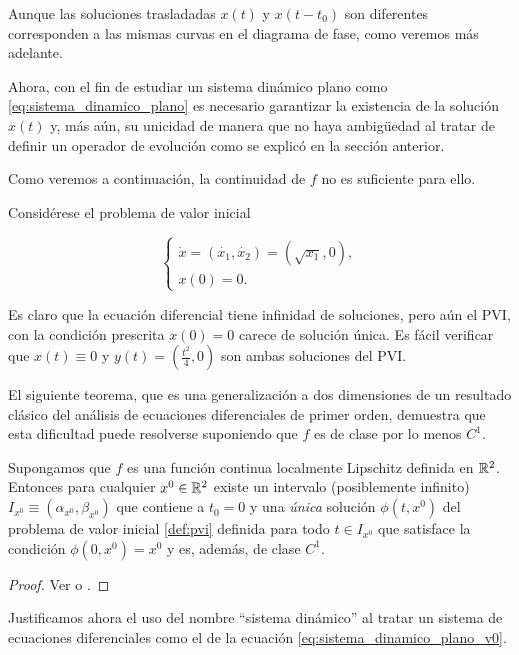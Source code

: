 Aunque las soluciones trasladadas $x(t)$ y $x(t-t_0)$ son diferentes corresponden a las mismas curvas en el diagrama de fase, como veremos más adelante.

Ahora, con el fin de estudiar un sistema dinámico plano como \ref{eq:sistema_dinamico_plano} es necesario garantizar la existencia de la solución $x(t)$ y, más aún, su unicidad de manera que no haya ambigüedad al tratar de definir un operador de evolución como se explicó en la sección anterior.

Como veremos a continuación, la continuidad de $f$ no es suficiente para ello.

\begin{example}Considérese el problema de valor inicial
    
$$
\left\{
    \begin{array}{l}
        \dot{x} = (\dot{x_1}, \dot{x_2}) = (\sqrt{x_1}, 0), \\
        x(0) = 0.
    \end{array}
\right.
$$

Es claro que la ecuación diferencial tiene infinidad de soluciones, pero aún el PVI, con la condición prescrita $x(0) = 0$ carece de solución única. Es fácil verificar que $x(t) \equiv 0$ y $y(t) = (\frac{t^2}{4}, 0) $ son ambas soluciones del PVI.
\end{example}

El siguiente teorema, que es una generalización a dos dimensiones de un resultado clásico del análisis de ecuaciones diferenciales de primer orden, demuestra que esta dificultad puede resolverse suponiendo que $f$ es de clase por lo menos $C^1$.

\begin{theorem} \label{teo:existenciayunicidad} Supongamos que $f$ es una función continua localmente Lipschitz definida en ${\mathbb{R}}^2$. Entonces para cualquier $x^0 \in {\ensuremath{\mathbb{R}}}^2$ existe un intervalo (posiblemente infinito) $I_{x^0} \equiv (\alpha_{x^0}, \beta_{x^0})$ que contiene a $t_0 = 0$ y una \emph{única} solución $\phi(t,x^0)$ del problema de valor inicial \ref{def:pvi} definida para todo $t \in I_{x^0}$ que satisface la condición $\phi(0, x^0) = x^0$ y es, además, de clase $C^1$.
\begin{proof}
Ver \cite[p.~10]{barrvalls} o \cite[p.~163]{smale}.
\end{proof}
\end{theorem}

Justificamos ahora el uso del nombre ``sistema dinámico'' al tratar un sistema de ecuaciones diferenciales como el de la ecuación \ref{eq:sistema_dinamico_plano_v0}.

